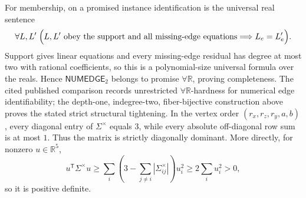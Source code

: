 For membership, on a promised instance identification is the universal real sentence
\[
\forall L,L'\;\Bigl(
L,L'\text{ obey the support and all missing-edge equations}
\Longrightarrow L_e=L'_e
\Bigr).
\]
Support gives linear equations and every missing-edge residual has degree at most two with rational coefficients, so this is a polynomial-size universal formula over the reals.  Hence \(\mathsf{NUMEDGE}_2\) belongs to promise \(\forall\mathbb R\), proving completeness.  The cited published comparison records unrestricted \(\forall\mathbb R\)-hardness for numerical edge identifiability; the depth-one, indegree-two, fiber-bijective construction above proves the stated strict structural tightening.
In the vertex order \((r_x,r_z,r_y,a,b)\), every diagonal entry of \(\Sigma^{\times}\) equals \(3\), while every absolute off-diagonal row sum is at most \(1\).  Thus the matrix is strictly diagonally dominant.  More directly, for nonzero \(u\in\mathbb R^5\),
\[
u^{\mathsf T}\Sigma^{\times}u
\ge\sum_i\left(3-\sum_{j\ne i}|\Sigma^{\times}_{ij}|\right)u_i^2
\ge2\sum_i u_i^2>0,
\]
so it is positive definite.

